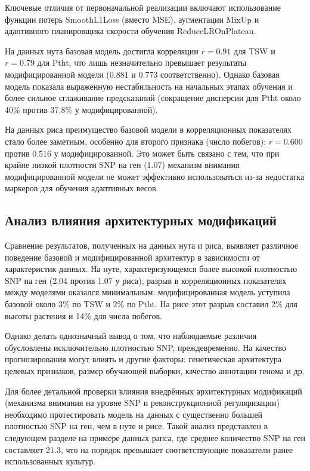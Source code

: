 Ключевые отличия от первоначальной реализации включают использование 
функции потерь SmoothL1Loss (вместо MSE), аугментации MixUp и адаптивного 
планировщика скорости обучения ReduceLROnPlateau.

На данных нута базовая модель достигла корреляции $r = 0.91$ для TSW 
и $r = 0.79$ для Ptht, что лишь незначительно превышает результаты 
модифицированной модели ($0.881$ и $0.773$ соответственно). Однако 
базовая модель показала выраженную нестабильность на начальных этапах 
обучения и более сильное сглаживание предсказаний (сокращение дисперсии 
для Ptht около 40\% против 37.8\% у модифицированной).

На данных риса преимущество базовой модели в корреляционных показателях 
стало более заметным, особенно для второго признака (число побегов): 
$r = 0.600$ против $0.516$ у модифицированной. Это может быть связано 
с тем, что при крайне низкой плотности SNP на ген (1.07) механизм 
внимания модифицированной модели не может эффективно использоваться 
из-за недостатка маркеров для обучения адаптивных весов.

\subsection{Анализ влияния архитектурных модификаций}

Сравнение результатов, полученных на данных нута и риса, выявляет 
различное поведение базовой и модифицированной архитектур в 
зависимости от характеристик данных. На нуте, характеризующемся 
более высокой плотностью SNP на ген (2.04 против 1.07 у риса), 
разрыв в корреляционных показателях между моделями оказался 
минимальным: модифицированная модель уступила базовой около 
3\% по TSW и 2\% по Ptht. На рисе этот разрыв составил 2\% 
для высоты растения и 14\% для числа побегов.

Однако делать однозначный вывод о том, что наблюдаемые различия 
обусловлены исключительно плотностью SNP, преждевременно. 
На качество прогнозирования могут влиять и другие факторы: 
генетическая архитектура целевых признаков, размер обучающей 
выборки, качество аннотации генома и др.

Для более детальной проверки влияния внедрённых архитектурных 
модификаций (механизма внимания на уровне SNP и реконструкционной 
регуляризации) необходимо протестировать модель на данных с 
существенно большей плотностью SNP на ген, чем в нуте и рисе. 
Такой анализ представлен в следующем разделе на примере данных 
рапса, где среднее количество SNP на ген составляет 21.3, что 
на порядок превышает соответствующие показатели ранее 
использованных культур.


